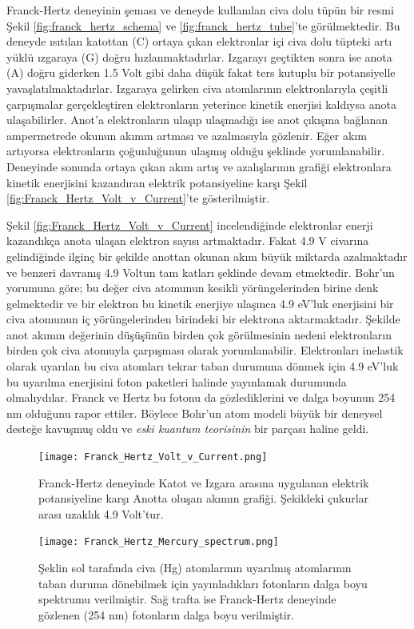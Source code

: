 \documentclass[a4paper,12pt, twoside]{article}
\begin{document}
Franck-Hertz deneyinin şeması ve deneyde kullanılan civa dolu tüpün bir resmi Şekil \ref{fig:franck_hertz_schema} ve \ref{fig:franck_hertz_tube}'te görülmektedir. Bu deneyde ısıtılan katottan (C) ortaya çıkan elektronlar içi civa dolu tüpteki artı yüklü ızgaraya (G) doğru hızlanmaktadırlar. Izgarayı geçtikten sonra ise anota (A) doğru giderken 1.5 Volt gibi daha düşük fakat ters kutuplu bir potansiyelle yavaşlatılmaktadırlar. Izgaraya gelirken civa atomlarının elektronlarıyla çeşitli çarpışmalar gerçekleştiren elektronların yeterince kinetik enerjisi kaldıysa anota ulaşabilirler. Anot'a elektronların ulaşıp ulaşmadığı ise anot çıkışına bağlanan ampermetrede okunun akımın artması ve azalmasıyla gözlenir. Eğer akım artıyorsa elektronların çoğunluğunun ulaşmış olduğu şeklinde yorumlanabilir. Deneyinde sonunda ortaya çıkan akım artış ve azalışlarının grafiği elektronlara kinetik enerjisini kazandıran elektrik potansiyeline karşı Şekil \ref{fig:Franck_Hertz_Volt_v_Current}'te gösterilmiştir.

Şekil \ref{fig:Franck_Hertz_Volt_v_Current} incelendiğinde elektronlar enerji kazandıkça anota ulaşan elektron sayısı artmaktadır. Fakat 4.9 V civarına gelindiğinde ilginç bir şekilde anottan okunan akım büyük miktarda azalmaktadır ve benzeri davranış 4.9 Voltun tam katları şeklinde devam etmektedir. Bohr'un yorumuna göre; bu değer civa atomunun kesikli yörüngelerinden birine denk gelmektedir ve bir elektron bu kinetik enerjiye ulaşınca 4.9 eV'luk enerjisini bir civa atomunun iç yörüngelerinden birindeki bir elektrona aktarmaktadır. Şekilde anot akımın değerinin düşüşünün birden çok görülmesinin nedeni elektronların birden çok civa atomuyla çarpışması olarak yorumlanabilir. Elektronları inelastik olarak uyarılan bu civa atomları tekrar taban durumuna dönmek için 4.9 eV'luk bu uyarılma enerjisini foton paketleri halinde yayınlamak durumunda olmalıydılar. Franck ve Hertz bu fotonu da gözlediklerini ve dalga boyunun 254 nm olduğunu rapor ettiler. Böylece Bohr'un atom modeli büyük bir deneysel desteğe kavuşmuş oldu ve \emph{eski kuantum teorisinin} bir parçası haline geldi.


\begin{figure}[hbtp]
	\center
	\begin{minipage}{.48\textwidth}
		\center
		\texttt{[image: Franck\_Hertz\_Volt\_v\_Current.png]}
		\caption{Franck-Hertz deneyinde Katot ve Izgara arasına uygulanan elektrik potansiyeline karşı Anotta oluşan akımın grafiği. Şekildeki çukurlar arası uzaklık 4.9 Volt'tur.}
		\label{fig:Franck_Hertz_Volt_v_Current}
	\end{minipage}
	\hspace{12pt}
	\begin{minipage}{.48\textwidth}
		\center
		\texttt{[image: Franck\_Hertz\_Mercury\_spectrum.png]}
		\caption{Şeklin sol tarafında civa (Hg) atomlarının uyarılmış atomlarının taban duruma dönebilmek için yayınladıkları fotonların dalga boyu spektrumu verilmiştir. Sağ trafta ise Franck-Hertz deneyinde gözlenen (254 nm) fotonların dalga boyu verilmiştir.}
		\label{fig:Franck_Hertz_Mercury_spectrum}
	\end{minipage}
\end{figure}
\end{document}
